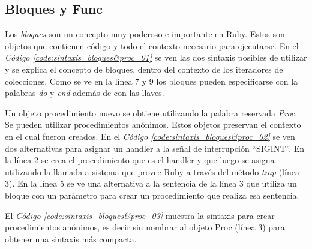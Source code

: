 \documentclass{article}
\newcommand{\refcode}[1]{\textit{Código \ref{#1}}}
\begin{document}
\subsection{Bloques y Func}

Los \textit{bloques} son un concepto muy poderoso e importante en Ruby. Estos son objetos que contienen código y todo el contexto necesario para ejecutarse.
En el \refcode{code:sintaxis_bloques&proc_01} se ven las dos sintaxis posibles de utilizar y se explica el concepto de bloques, dentro del contexto de los iteradores de colecciones. Como se ve en la línea 7 y 9 los bloques pueden especificarse con la palabras \textit{do} y \textit{end} además de con las llaves.
\bigskip

 
\bigskip\bigskip

Un objeto procedimiento nuevo se obtiene utilizando la palabra reservada \textit{Proc}. Se pueden utilizar procedimientos anónimos. Estos objetos preservan el contexto en el cual fueron creados.
En el \refcode{code:sintaxis_bloques&proc_02} se ven dos alternativas para asignar un handler a la señal de interrupción “SIGINT”. En la línea 2 se crea el procedimiento que es el handler y que luego se asigna utilizando la llamada a sistema que provee Ruby a través del método \textit{trap} (línea 3). En la línea 5 se ve una alternativa a la sentencia de la línea 3 que utiliza un bloque con un parámetro para crear un procedimiento que realiza esa sentencia. 
\bigskip


\bigskip\bigskip

El \refcode{code:sintaxis_bloques&proc_03} muestra la sintaxis para crear procedimientos anónimos, es decir sin nombrar al objeto Proc (línea 3) para obtener una sintaxis más compacta.

 
\bigskip\bigskip
\end{document}
